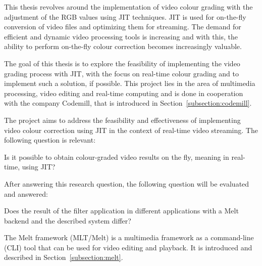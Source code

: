 \documentclass[../MasterThesis.tex]{subfiles}
\begin{document}
	
	This thesis revolves around the implementation of video colour grading with the adjustment of the RGB values using JIT techniques. 	
	JIT is used for on-the-fly conversion of video files and optimizing them for streaming. 
	The demand for efficient and dynamic video processing tools is increasing and with this, the ability to perform on-the-fly colour correction becomes increasingly valuable. 
	
	
	The goal of this thesis is to explore the feasibility of implementing the video grading process with JIT, with the focus on real-time colour grading and to implement such a solution, if possible. This project lies in the area of multimedia processing, video editing and real-time computing and is done in cooperation with the company Codemill, that is introduced in Section~\ref{subsection:codemill}.
	
	
	
	The project aims to address the feasibility and effectiveness of implementing video colour correction using JIT in the context of real-time video streaming. The following question is relevant:
	
	\begin{researchbox}
		Is it possible to obtain colour-graded video results on the fly, meaning in real-time, using JIT?
	\end{researchbox}
	
	After answering this research question, the following question will be evaluated and answered:
	
	\begin{researchbox}
		Does the result of the filter application in different applications with a Melt backend and the described system differ? 
	\end{researchbox}

	The Melt framework (MLT/Melt) is a multimedia framework as a command-line (CLI) tool that can be used for video editing and playback. It is introduced and described in Section~\ref{subsection:melt}.

\end{document}
